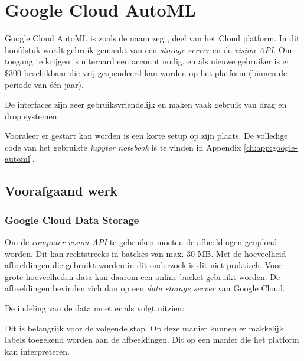 
\chapter{Google Cloud AutoML}
\label{ch:google-automl}

Google Cloud AutoML is zoals de naam zegt, deel van het Cloud platform. In dit hoofdstuk wordt gebruik gemaakt van een \textit{storage server} en de \textit{vision API}. Om toegang te krijgen is uiteraard een account nodig, en als nieuwe gebruiker is er \$300 beschikbaar die vrij gespendeerd kan worden op het platform (binnen de periode van één jaar).

De interfaces zijn zeer gebruiksvriendelijk en maken vaak gebruik van drag en drop systemen. 

Vooraleer er gestart kan worden is een korte setup op zijn plaats. De volledige code van het gebruikte \textit{jupyter notebook} is te vinden in Appendix \ref{ch:app:google-automl}.

\section{Voorafgaand werk}
\label{sec:google-automl-before}

\subsection{Google Cloud Data Storage}
\label{subsec:google-cloud-data-storage}

Om de \textit{computer vision API} te gebruiken moeten de afbeeldingen geüpload worden. Dit kan rechtstreeks in batches van max. 30 MB. Met de hoeveelheid afbeeldingen die gebruikt worden in dit onderzoek is dit niet praktisch. Voor grote hoeveelheden data kan daarom een online bucket gebruikt worden. De afbeeldingen bevinden zich dan op een \textit{data storage server} van Google Cloud.

De indeling van de data moet er als volgt uitzien:


Dit is belangrijk voor de volgende stap. Op deze manier kunnen er makkelijk labels toegekend worden aan de afbeeldingen. Dit op een manier die het platform kan interpreteren.

